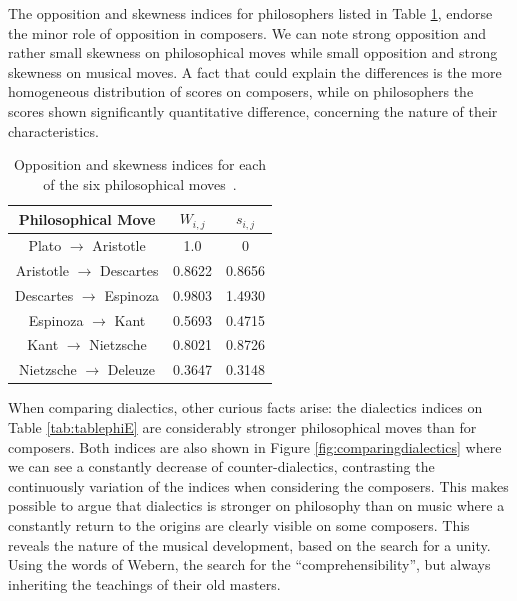 \documentclass[
 aip,
 jmp,
 amsmath,amssymb,
 reprint,
]{revtex4-1}
\begin{document}


The opposition and skewness indices for philosophers listed in Table
\ref{tab:tablephiOI}, endorse the minor role of opposition in
composers. We can note strong opposition and rather small skewness
on philosophical moves while small opposition and strong skewness on
musical moves. A fact that could explain the differences is the more
homogeneous distribution of scores on composers, while on philosophers
the scores shown significantly quantitative difference, concerning the
nature of their characteristics. 

\begin{table}%
\caption{\label{tab:tablephiOI}Opposition and skewness indices for each
of the six philosophical moves~\cite{Fabbri}.}

\begin{tabular}{|c||c|c|}
\hline
Philosophical Move & $W_{i,j}$ & $s_{i,j}$ \\
\hline \hline
Plato $\rightarrow$ Aristotle &  1.0 & 0 \\
Aristotle $\rightarrow$ Descartes & 0.8622 & 0.8656 \\
Descartes $\rightarrow$ Espinoza & 0.9803 & 1.4930 \\
Espinoza $\rightarrow$ Kant & 0.5693 & 0.4715 \\
Kant $\rightarrow$ Nietzsche & 0.8021 & 0.8726 \\
Nietzsche $\rightarrow$ Deleuze & 0.3647 & 0.3148 \\
\hline
\end{tabular}
\end{table}

When comparing dialectics, other curious facts arise: the dialectics
indices on Table \ref{tab:tablephiE} are considerably stronger philosophical moves than for
composers. Both indices are also shown in Figure
\ref{fig:comparingdialectics} where we can see a constantly decrease
of counter-dialectics, contrasting the continuously variation of the
indices when considering the composers. This makes possible to argue
that dialectics is stronger on philosophy than on music where a
constantly return to the origins are clearly visible on some
composers. This reveals the nature of the
musical development, based on the search for a unity. Using the words
of Webern, the search for the ``comprehensibility'', but always
inheriting the teachings of their old masters.
\end{document}
